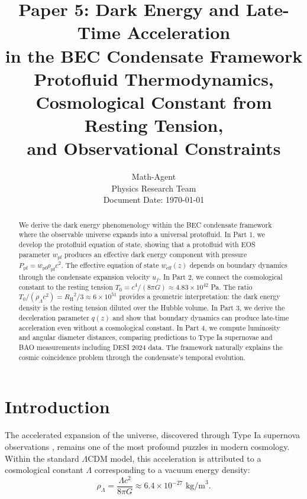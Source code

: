 \documentclass[11pt,a4paper]{article}
\title{\textbf{Paper 5: Dark Energy and Late-Time Acceleration\\in the BEC Condensate Framework}\\[0.5em]
\large Protofluid Thermodynamics, Cosmological Constant from Resting Tension,\\and Observational Constraints}
\author{Math-Agent\\[0.3em]
\small Physics Research Team\\
\small Document Date: \today}
\date{}
\newcommand{\Tzero}{\ensuremath{T_0}}
\newcommand{\RH}{\ensuremath{R_{\mathrm{H}}}}
\newcommand{\wpf}{\ensuremath{w_{\mathrm{pf}}}}
\newcommand{\weff}{\ensuremath{w_{\mathrm{eff}}}}
\newcommand{\Ppf}{\ensuremath{P_{\mathrm{pf}}}}
\newcommand{\rhopf}{\ensuremath{\rho_{\mathrm{pf}}}}
\theoremstyle{definition}
\theoremstyle{remark}
\begin{document}
\maketitle

\begin{abstract}
We derive the dark energy phenomenology within the BEC condensate framework where the observable universe expands into a universal protofluid. In Part 1, we develop the protofluid equation of state, showing that a protofluid with EOS parameter $\wpf$ produces an effective dark energy component with pressure $\Ppf = \wpf \rhopf c^2$. The effective equation of state $\weff(z)$ depends on boundary dynamics through the condensate expansion velocity $u_f$. In Part 2, we connect the cosmological constant to the resting tension $\Tzero = c^4/(8\pi G) \approx 4.83 \times 10^{42}$ Pa. The ratio $\Tzero/(\rho_\Lambda c^2) = \RH^2/3 \approx 6 \times 10^{51}$ provides a geometric interpretation: the dark energy density is the resting tension diluted over the Hubble volume. In Part 3, we derive the deceleration parameter $q(z)$ and show that boundary dynamics can produce late-time acceleration even without a cosmological constant. In Part 4, we compute luminosity and angular diameter distances, comparing predictions to Type Ia supernovae and BAO measurements including DESI 2024 data. The framework naturally explains the cosmic coincidence problem through the condensate's temporal evolution.
\end{abstract}

\tableofcontents
\newpage

\section{Introduction}
\label{sec:introduction}

The accelerated expansion of the universe, discovered through Type Ia supernova observations \cite{Riess1998,Perlmutter1999}, remains one of the most profound puzzles in modern cosmology. Within the standard $\Lambda$CDM model, this acceleration is attributed to a cosmological constant $\Lambda$ corresponding to a vacuum energy density:
\begin{equation}
\rho_\Lambda = \frac{\Lambda c^2}{8\pi G} \approx 6.4 \times 10^{-27} \text{ kg/m}^3.
\end{equation}
\end{document}
